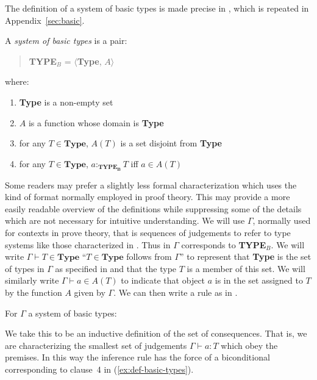 The definition of a system of basic types is made precise in
\nexteg{}, which is repeated in
Appendix~\ref{sec:basic}.  

\begin{ex}
A {\it system of basic types\/} is a pair:
\begin{quote}
{\bf TYPE$_B$} = $\langle${\bf Type}, $A$$\rangle$
\end{quote}
where:
\begin{enumerate} 
 
\item \textbf{Type} is a non-empty set 
 
\item $A$ is a function whose domain is \textbf{Type}

\item for any $T\in\textbf{Type}$, $A(T)$ is a set disjoint from
  \textbf{Type}

\item for any $T\in\textbf{Type}$, $a:_{\mathbf{TYPE_B}}T$ iff $a\in A(T)$
 
\end{enumerate}

\label{ex:def-basic-types}
\end{ex} 

Some readers may prefer a slightly less formal characterization which
uses the kind of format normally employed in proof theory.  This may
provide a more easily readable overview of the definitions while
suppressing some of the details which are not necessary for intuitive
understanding.  We will use $\Gamma$, normally used for contexts in
prove theory, that is sequences of judgements to refer to type systems
like those characterized in \preveg{}.  Thus in \nexteg{} $\Gamma$
corresponds to \textbf{TYPE}$_B$.  We will write
$\Gamma\vdash T\in\textbf{Type}$ ``$T\in\textbf{Type}$ follows from
$\Gamma$'' to represent that \textbf{Type} is the set of types in
$\Gamma$  as
specified in \preveg{} and that the type $T$ is a member of this set.
We will similarly write $\Gamma\vdash a\in A(T)$ to indicate that
object $a$ is in the set assigned to $T$ by the function $A$ given by $\Gamma$.
We can then write a rule as in \nexteg{}.
\begin{ex} 
For $\Gamma$ a system of basic types:

\begin{prooftree}
 
\end{prooftree} 
\end{ex} 
We take this to be an inductive definition of the set of consequences.
That is, we are characterizing the smallest set of judgements
$\Gamma\vdash a:T$ which obey the premises.  In this way the inference
rule \preveg{} has the force of a biconditional corresponding to
clause~4 in (\ref{ex:def-basic-types}).   

